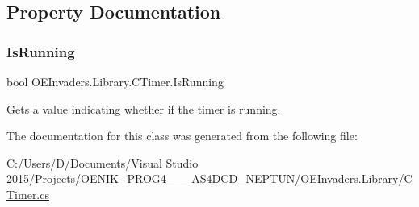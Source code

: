 \subsection{Property Documentation}
\mbox{\label{class_o_e_invaders_1_1_library_1_1_c_timer_a4c86b1242a54306eaaef498f81c7969c}} 
\subsubsection{\texorpdfstring{IsRunning}{IsRunning}}
{\footnotesize\ttfamily bool O\+E\+Invaders.\+Library.\+C\+Timer.\+Is\+Running\hspace{0.3cm}{\ttfamily [get]}}



Gets a value indicating whether if the timer is running. 



The documentation for this class was generated from the following file\+:\begin{DoxyCompactItemize}
\item 
C\+:/\+Users/\+D/\+Documents/\+Visual Studio 2015/\+Projects/\+O\+E\+N\+I\+K\+\_\+\+P\+R\+O\+G4\+\_\+\_\+\_\+\+A\+S4\+D\+C\+D\+\_\+\+N\+E\+P\+T\+U\+N/\+O\+E\+Invaders.\+Library/\mbox{\hyperlink{_c_timer_8cs}{C\+Timer.\+cs}}\end{DoxyCompactItemize}
